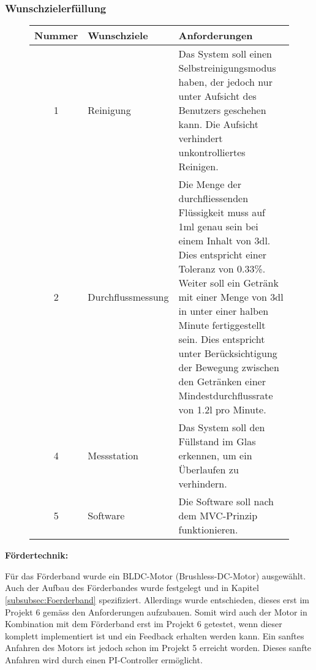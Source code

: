\subsubsection{Wunschzielerfüllung}
\label{subsubsec:Wunschzielerfüllung}

\begin{figure}[H]
	\begin{flushleft}
		\small
		\begin{tabular}{|p{3cm}|p{3.25cm}|p{9.85cm}|}%
\hline
\multicolumn{1}{|l|}{\textbf{Nummer}} & \textbf{Wunschziele}  & \textbf{Anforderungen}                                                                                                                                         \\ \hline
		
\multicolumn{1}{|c|}{\cellcolor{red}1} & \cellcolor{red}Reinigung & \cellcolor{red}Das System soll einen Selbstreinigungsmodus haben, der jedoch nur unter Aufsicht des Benutzers geschehen kann. Die Aufsicht verhindert unkontrolliertes Reinigen. \\ \hline

\multicolumn{1}{|c|}{\cellcolor{red}2} & \cellcolor{red}Durchflussmessung & \cellcolor{red}Die Menge der durchfliessenden Flüssigkeit muss auf 1ml genau sein bei einem Inhalt von 3dl. Dies entspricht einer Toleranz von 0.33\%. Weiter soll ein Getränk mit einer Menge von 3dl in unter einer halben Minute fertiggestellt sein. Dies entspricht unter Berücksichtigung der Bewegung zwischen den Getränken einer Mindestdurchflussrate von 1.2l pro Minute. \\ \hline

\multicolumn{1}{|c|}{\cellcolor{red}4} & \cellcolor{red}Messstation & \cellcolor{red}Das System soll den Füllstand im Glas erkennen, um ein Überlaufen zu verhindern.\\ \hline
			
\multicolumn{1}{|c|}{\cellcolor{red}5} & \cellcolor{red}Software & \cellcolor{red}Die Software soll nach dem MVC-Prinzip funktionieren. \\ 
			\hline
		\end{tabular}
	\end{flushleft}

	\label{table:Wunschziele}
\end{figure}

\textbf{Fördertechnik:}

Für das Förderband wurde ein BLDC-Motor (Brushless-DC-Motor) ausgewählt. Auch der Aufbau des Förderbandes wurde festgelegt und in Kapitel \ref{subsubsec:Foerderband} spezifiziert. Allerdings wurde entschieden, dieses erst im Projekt 6 gemäss den Anforderungen aufzubauen. Somit wird auch der Motor in Kombination mit dem Förderband erst im Projekt 6 getestet, wenn dieser komplett implementiert ist und ein Feedback erhalten werden kann. Ein sanftes Anfahren des Motors ist jedoch schon im Projekt 5 erreicht worden. Dieses sanfte Anfahren wird durch einen PI-Controller ermöglicht.


